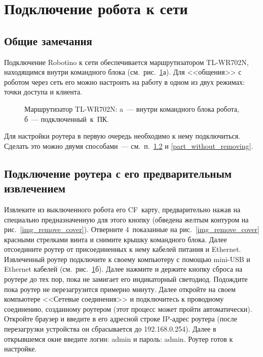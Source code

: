 \section{Подключение робота к сети}
\subsection{Общие замечания}
Подключение Robotino к сети обеспечивается маршрутизатором TL-WR702N, находящимся внутри командного блока (см.~рис.~\ref{img_robotino_router}а).
Для <<общения>> с роботом через сеть его можно настроить на работу в одном из двух режимах: точки доступа и клиента.

\begin{figure}[h]
	\begin{minipage}[h]{0.49\linewidth}
	\end{minipage}
	\hfill
	\begin{minipage}[h]{0.49\linewidth}
	\end{minipage}
	\caption{Маршрутизатор TL-WR702N: a~--- внутри командного блока робота, б~--- подключенный~к~ПК.}
	\label{img_robotino_router}
\end{figure}

Для настройки роутера в первую очередь необходимо к нему подключиться.
Сделать это можно двумя способами~--- см.~п.~\ref{part_with_removing} и \ref{part_without_removing}.



\subsection{Подключение роутера с его предварительным извлечением}\label{part_with_removing}
Извлеките из выключенного робота его CF~карту, предварительно нажав на специально предназначенную для этого кнопку (обведена желтым контуром на рис.~\ref{img_remove_cover}).
Отверните 4~показанные на рис.~\ref{img_remove_cover} красными стрелками винта и снимите крышку командного блока.
Далее отсоедините роутер от присоединенных к нему кабелей питания и Ethernet.
Извлеченный роутер подключите к своему компьютеру с помощью mini-USB и Ethernet кабелей (см.~рис.~\ref{img_robotino_router}б).
Далее нажмите и держите кнопку сброса на роутере до тех пор, пока не замигает его индикаторный светодиод.
Подождите пока роутер не перезагрузится примерно минуту.
Далее откройте на своем компьютере <<Сетевые соединения>> и подключитесь к проводному соединению, созданному роутером (этот процесс может пройти автоматически).
Откройте браузер и введите в его адресной строке IP-адрес роутера (после перезагрузки устройства он сбрасывается до 192.168.0.254).
Далее в открывшемся окне введите логин: admin и пароль: admin.
Роутер готов к настройке.




